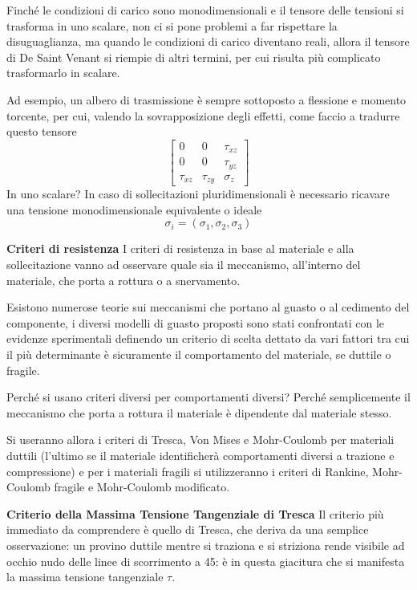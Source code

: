 \documentclass{article}
\begin{document}
\begin{adjustwidth}{2in}{}
		 Finché le condizioni di carico sono monodimensionali e il tensore delle tensioni si trasforma in uno scalare, non ci si pone problemi a far rispettare la disuguaglianza, ma quando le condizioni di carico diventano reali, allora il tensore di De Saint Venant si riempie di altri termini, per cui risulta più complicato trasformarlo in scalare. 
		 
		 Ad esempio, un albero di trasmissione è sempre sottoposto a flessione e momento torcente, per cui, valendo la sovrapposizione degli effetti, come faccio a tradurre questo tensore
		 \[\left[\begin{array}{ccc}
		 	0 & 0 & \tau_{xz} \\
		 	0 & 0 & \tau_{yz} \\
		 	\tau_{xz} & \tau_{zy} & \sigma_z
		 \end{array}\right]\]
	 	In uno scalare? In caso di sollecitazioni pluridimensionali è necessario ricavare una
	 	tensione monodimensionale equivalente o
	 	ideale 
	 	\[\sigma_i = (\sigma_1, \sigma_2, \sigma_3)\]
	 	
	 	\textbf{{\Large Criteri di resistenza}}\newline 
	 	 I criteri di resistenza in base al materiale e alla sollecitazione vanno ad osservare quale sia il meccanismo, all'interno del materiale, che porta a rottura o a snervamento. 
	 	
	 	Esistono numerose teorie sui meccanismi che portano al guasto o al cedimento del componente, i
	 	diversi modelli di guasto proposti sono stati confrontati con le evidenze sperimentali definendo un criterio
	 	di scelta dettato da vari fattori tra cui il più determinante è sicuramente il comportamento del materiale, se duttile o fragile. 
	 	
	 	Perché si usano criteri diversi per comportamenti diversi? Perché semplicemente il meccanismo che porta a rottura il materiale è dipendente dal materiale stesso. 
	 	
	 	Si useranno allora i criteri di Tresca, Von Mises e Mohr-Coulomb per materiali duttili (l'ultimo se il materiale identificherà comportamenti diversi a trazione e compressione) e per i materiali fragili si utilizzeranno i criteri di Rankine, Mohr-Coulomb fragile e Mohr-Coulomb modificato. \newline 
	 	
	 	\textbf{{\Large Criterio della Massima Tensione Tangenziale di Tresca}} \newline 
	 	Il criterio più immediato da comprendere è quello di Tresca, che deriva da una semplice osservazione: un provino duttile mentre si traziona e si striziona rende visibile ad occhio nudo delle linee di scorrimento a 45\degree: è in questa giacitura che si manifesta la massima tensione tangenziale $\tau$. \newline
	 	

\end{adjustwidth}
\end{document}
